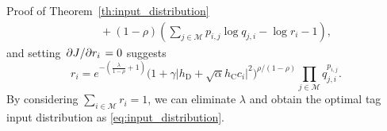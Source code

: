 \documentclass[journal]{IEEEtran}
\begin{document}
\begin{appendix}
\begin{subsection}{Proof of Theorem~\ref{th:input_distribution}}
\begin{align}
				& \quad + (1 - \rho) \left( \sum_{j \in \mathcal{M}} p_{i,j} \log q_{j, i} - \log r_i - 1 \right),
			\end{align}
			and setting $\pdv*{J}{r_i} = 0$ suggests
			\begin{equation}
				r_i = e^{ -(\frac{\lambda}{1 - \rho} + 1)} \bigl( 1 + \gamma \lvert h_{\mathrm{D}} + \sqrt{\alpha} h_{\mathrm{C}} c_i \rvert^2 \bigr)^{\rho / (1 - \rho)} \prod_{j \in \mathcal{M}} q_{j, i}^{p_{i,j}}.
			\end{equation}
			By considering $\sum_{i \in \mathcal{M}} r_i = 1$, we can eliminate $\lambda$ and obtain the optimal tag input distribution as \eqref{eq:input_distribution}.
			\label{ap:input_distribution}
		\end{subsection}
	\end{appendix}

	
	
\end{document}
